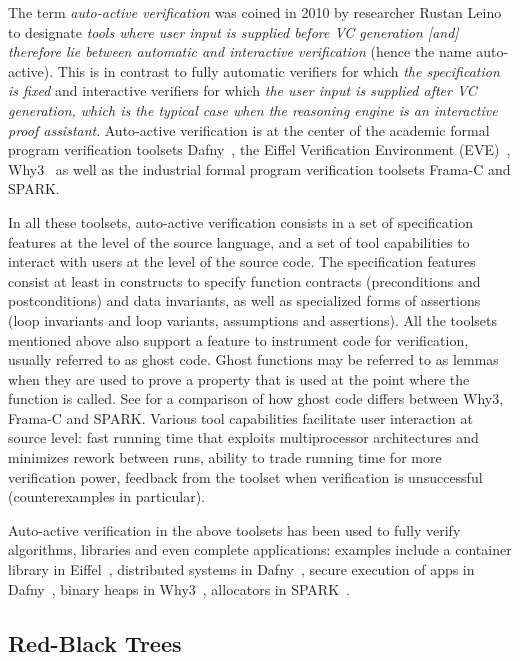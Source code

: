 \documentclass{llncs}
\newcommand{\spark}{SPARK\xspace}
\begin{document}
The term \emph{auto-active verification} was coined in 2010 by researcher
Rustan Leino~\cite{Leino10usableauto-active} to designate \textit{tools where
  user input is supplied before VC generation [and] therefore lie between
  automatic and interactive verification} (hence the name auto-active). This is
in contrast to fully automatic verifiers for which \textit{the specification is
  fixed} and interactive verifiers for which \textit{the user input is supplied
  after VC generation, which is the typical case when the reasoning engine is
  an interactive proof assistant}. Auto-active verification is at the center of
the academic formal program verification toolsets Dafny~\cite{Leino2010Dafny},
the Eiffel Verification Environment (EVE)~\cite{Furia2016},
Why3~\cite{filliatre2013Why3} as well as the industrial formal program
verification toolsets Frama-C and \spark.

In all these toolsets, auto-active verification consists in a set of
specification features at the level of the source language, and a set of tool
capabilities to interact with users at the level of the source code. The
specification features consist at least in constructs to specify function
contracts (preconditions and postconditions) and data invariants, as well as
specialized forms of assertions (loop invariants and loop variants, assumptions
and assertions). All the toolsets mentioned above also support a feature to
instrument code for verification, usually referred to as ghost code. Ghost
functions may be referred to as lemmas when they are used to prove a property
that is used at the point where the function is called. See
\cite{kosmatov:hal-01344110} for a comparison of how ghost code differs between
Why3, Frama-C and \spark. Various tool capabilities facilitate user interaction
at source level: fast running time that exploits multiprocessor architectures
and minimizes rework between runs, ability to trade running time for more
verification power, feedback from the toolset when verification is unsuccessful
(counterexamples in particular).

Auto-active verification in the above toolsets has been used to fully verify
algorithms, libraries and even complete applications: examples include a
container library in Eiffel~\cite{Polikarpova2015}, distributed systems in
Dafny~\cite{Hawblitzel2015IronFleet}, secure execution of apps in
Dafny~\cite{Hawblitzel2014Ironclad}, binary heaps in Why3~\cite{tafat11rr},
allocators in \spark~\cite{Dross2016}.

\subsection{Red-Black Trees}
\label{sec-prelim-rbt}
\end{document}
